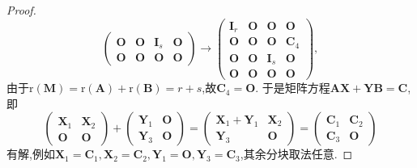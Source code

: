 \documentclass[../../main.tex]{subfiles}%
\begin{document}
\begin{proof}
\[\begin{pmatrix}
\boldsymbol{O}&\boldsymbol{O}&\boldsymbol{I}_s&\boldsymbol{O}\\
\boldsymbol{O}&\boldsymbol{O}&\boldsymbol{O}&\boldsymbol{O}
\end{pmatrix}\to\begin{pmatrix}
\boldsymbol{I}_r&\boldsymbol{O}&\boldsymbol{O}&\boldsymbol{O}\\
\boldsymbol{O}&\boldsymbol{O}&\boldsymbol{O}&\boldsymbol{C}_4\\
\boldsymbol{O}&\boldsymbol{O}&\boldsymbol{I}_s&\boldsymbol{O}\\
\boldsymbol{O}&\boldsymbol{O}&\boldsymbol{O}&\boldsymbol{O}
\end{pmatrix},
\]
由于\(\mathrm{r}(\boldsymbol{M})=\mathrm{r}(\boldsymbol{A})+\mathrm{r}(\boldsymbol{B})=r + s\),故\(\boldsymbol{C}_4=\boldsymbol{O}\). 于是矩阵方程\(\boldsymbol{A}\boldsymbol{X}+\boldsymbol{Y}\boldsymbol{B}=\boldsymbol{C}\),即
\[
\begin{pmatrix}
\boldsymbol{X}_1&\boldsymbol{X}_2\\
\boldsymbol{O}&\boldsymbol{O}
\end{pmatrix}+\begin{pmatrix}
\boldsymbol{Y}_1&\boldsymbol{O}\\
\boldsymbol{Y}_3&\boldsymbol{O}
\end{pmatrix}=\begin{pmatrix}
\boldsymbol{X}_1+\boldsymbol{Y}_1&\boldsymbol{X}_2\\
\boldsymbol{Y}_3&\boldsymbol{O}
\end{pmatrix}=\begin{pmatrix}
\boldsymbol{C}_1&\boldsymbol{C}_2\\
\boldsymbol{C}_3&\boldsymbol{O}
\end{pmatrix}
\]
有解,例如\(\boldsymbol{X}_1=\boldsymbol{C}_1,\boldsymbol{X}_2=\boldsymbol{C}_2,\boldsymbol{Y}_1=\boldsymbol{O},\boldsymbol{Y}_3=\boldsymbol{C}_3\),其余分块取法任意.
\end{proof}
\end{document}
